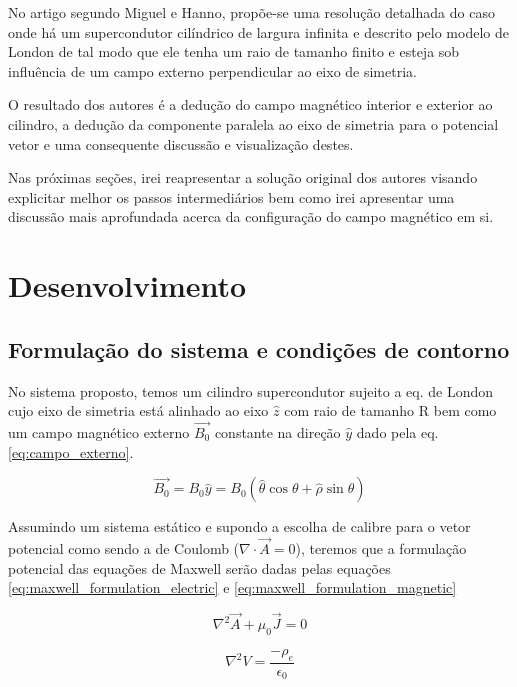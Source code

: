 \documentclass[%
 reprint,
 amsmath,amssymb,
 aps,
]{revtex4-1}
\begin{document}
No artigo segundo Miguel e Hanno, propõe-se uma resolução detalhada do caso onde há um supercondutor cilíndrico de largura infinita e descrito pelo modelo de London de tal modo que ele tenha um raio de tamanho finito e esteja sob influência de um campo externo perpendicular ao eixo de simetria. \cite{original_article}

O resultado dos autores é a dedução do campo magnético interior e exterior ao cilindro, a dedução da componente paralela ao eixo de simetria para o potencial vetor e uma consequente discussão e visualização destes.

Nas próximas seções, irei reapresentar a solução original dos autores visando explicitar melhor os passos intermediários bem como irei apresentar uma discussão mais aprofundada acerca da configuração do campo magnético em si.

\section{Desenvolvimento}

\subsection{Formulação do sistema e condições de contorno}


No sistema proposto, temos um cilindro supercondutor sujeito a eq. de London cujo eixo de simetria está alinhado ao eixo $\hat{z}$ com raio de tamanho R bem como um campo magnético externo $\vec{B_0}$ constante na direção $\hat{y}$ dado pela eq. \ref{eq:campo_externo}.  

\begin{equation}
    \label{eq:campo_externo}
    \vec{B_0} = B_0 \hat {y} = B_0 (\hat{\theta} \cos{\theta} + \hat{\rho} \sin{\theta})
\end{equation}

Assumindo um sistema estático e supondo a escolha de calibre para o vetor potencial como sendo a de Coulomb ($\nabla \cdot \vec{A} = 0$), teremos que a formulação potencial das equações de Maxwell serão dadas pelas equações \ref{eq:maxwell_formulation_electric} e \ref{eq:maxwell_formulation_magnetic}

\begin{equation}
    \label{eq:maxwell_formulation_magnetic}
    \nabla^2 \vec{A} + \mu_0 \vec{J} = 0
\end{equation}

\begin{equation}
    \label{eq:maxwell_formulation_electric}
     \nabla^2 V = \frac{-\rho_ e}{\epsilon_0} 
\end{equation}
\end{document}
